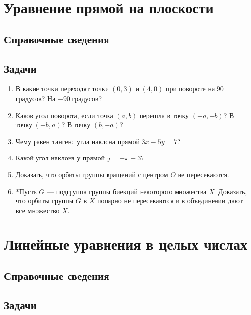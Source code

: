 \section{Уравнение прямой на плоскости}

\subsection*{Справочные сведения}

\subsection*{Задачи}

\begin{enumerate}
\item В какие точки переходят точки $(0,3)$ и $(4,0)$ при повороте на $90$ градусов? На $-90$ градусов?
\item Каков угол поворота, если точка $(a,b)$ перешла в точку $(-a,-b)$? В точку $(-b,a)$? В точку $(b,-a)$?
\item Чему равен тангенс угла наклона прямой $3x-5y=7$?
\item Какой угол наклона у прямой $y=-x+3$?
\item Доказать, что орбиты группы вращений с центром $O$ не пересекаются.
\item *Пусть $G$ --- подгруппа группы биекций некоторого множества $X$. Доказать, что орбиты группы $G$ в $X$ попарно не пересекаются и в объединении дают все множество $X$.
\end{enumerate}


\section{Линейные уравнения в целых числах}

\subsection*{Справочные сведения}

\subsection*{Задачи}
\begin{enumerate}
\end{enumerate}

\label{Fields}


